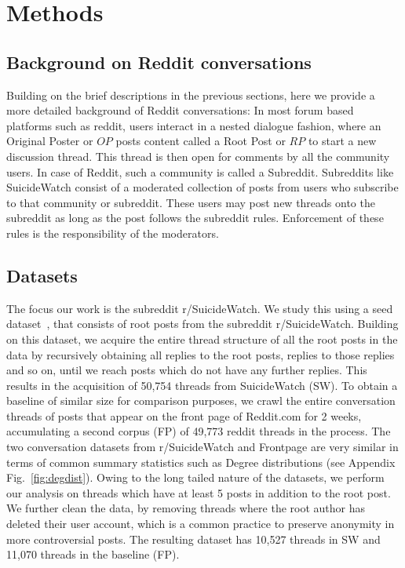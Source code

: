 \section{Methods}
\label{section:methods}
\subsection{Background on Reddit conversations}
Building on the brief descriptions in the previous sections, here we provide a more detailed background of Reddit conversations: In most forum based platforms such as reddit,  users interact in a nested dialogue fashion, where an Original Poster or $OP$ posts content called a Root Post or $RP$ to start  a new discussion thread. This thread is then open for comments by all the community users. In case of Reddit, such a community is called a Subreddit. Subreddits like SuicideWatch consist of a moderated collection of posts from users who subscribe to that community or subreddit. These users may post new threads onto the subreddit as long as the post follows the subreddit rules. Enforcement of these rules is the responsibility of the moderators. %

\subsection{Datasets} \label{sec:data}
The focus our work is the subreddit r/SuicideWatch. We study this using a seed dataset~\cite{gkotsis2017characterisation}, that consists of root posts from the subreddit r/SuicideWatch. Building on this dataset, we acquire the entire thread structure of all the root posts in the data by recursively obtaining all replies to the root posts, replies to those replies and so on, until we reach posts which do not have any further replies. This results in the acquisition of 50,754 threads from SuicideWatch (SW). To obtain a baseline of similar size for comparison purposes, we crawl the entire conversation threads of posts that appear on the front page of Reddit.com  for 2 weeks,  accumulating a second corpus (FP) of 49,773 reddit threads in the process. 
%
The two conversation datasets from r/SuicideWatch and Frontpage are very similar in terms of common summary statistics such as Degree distributions (see Appendix Fig.~\ref{fig:degdist}). 
Owing to the long tailed nature of the datasets, we perform our analysis on threads  which have at least 5 posts in addition to the root post.
We further clean the data, by removing threads where the root author has deleted their user account, which is a common practice to preserve anonymity in more controversial posts. The resulting dataset has 10,527 threads in SW and 11,070 threads in the baseline (FP). 

